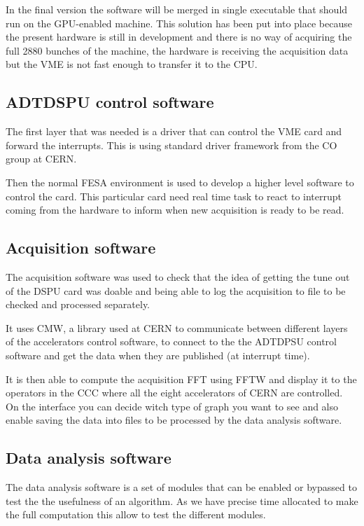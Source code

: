 In the final version the software will be merged in single executable that should run on the \gls{GPU}-enabled machine. This solution has been put into place because the present hardware is still in development and there is no way of acquiring the full 2880 bunches of the machine, the hardware is receiving the acquisition data but the \gls{VME} is not fast enough to transfer it to the \gls{CPU}.

	\subsection{ADTDSPU control software}

	The first layer that was needed is a driver that can control the \gls{VME} card and forward the interrupts. This is using standard driver framework from the \gls{CO} group at \gls{CERN}.

	Then the normal \gls{FESA} environment is used to develop a higher level software to control the card. This particular card need real time task to react to interrupt coming from the hardware to inform when new acquisition is ready to be read.

	\subsection{Acquisition software}

	The acquisition software was used to check that the idea of getting the tune out of the DSPU card was doable and being able to log the acquisition to file to be checked and processed separately.

	It uses \gls{CMW}, a library used at \gls{CERN} to communicate between different layers of the accelerators control software, to connect to the the ADTDPSU control software and get the data when they are published (at interrupt time).

	It is then able to compute the acquisition \gls{FFT} using \gls{FFTW} and display it to the operators in the \gls{CCC} where all the eight accelerators of \gls{CERN} are controlled. On the interface you can decide witch type of graph you want to see and also enable saving the data into files to be processed by the data analysis software.

	\subsection{Data analysis software}

	The data analysis software is a set of modules that can be enabled or bypassed to test the the usefulness of an algorithm. As we have precise time allocated to make the full computation this allow to test the different modules.

